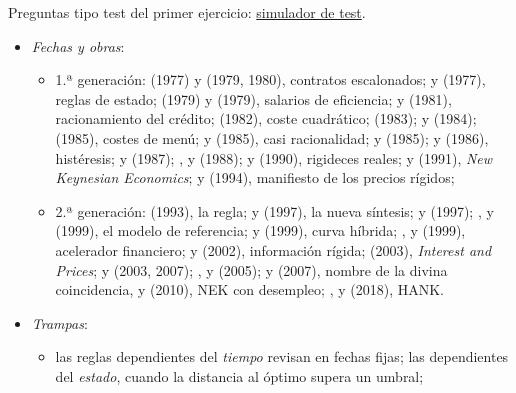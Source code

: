 \documentclass[11pt]{article}
\begin{document}
\begin{anotaciones}
Preguntas tipo test del primer ejercicio: \href{https://www.victorgutierrezmarcos.es/oposicion/temario/primer-ejercicio/test/simulador.html?tema=3.A.7}{simulador de test}.
\end{anotaciones}

\begin{itemize}
\item \emph{Fechas y obras}:
  \begin{itemize}
  \item 1.ª generación:  (1977) y  (1979, 1980), contratos escalonados;  y  (1977), reglas de estado;  (1979) y  (1979), salarios de eficiencia;  y  (1981), racionamiento del crédito;  (1982), coste cuadrático;  (1983);  y  (1984);  (1985), costes de menú;  y  (1985), casi racionalidad;  y  (1985);  y  (1986), histéresis;  y  (1987); ,  y  (1988);  y  (1990), rigideces reales;  y  (1991), \emph{New Keynesian Economics};  y  (1994), manifiesto de los precios rígidos;
  \item 2.ª generación:  (1993), la regla;  y  (1997), la nueva síntesis;  y  (1997); ,  y  (1999), el modelo de referencia;  y  (1999), curva híbrida; ,  y  (1999), acelerador financiero;  y  (2002), información rígida;  (2003), \emph{Interest and Prices};  y  (2003, 2007); ,  y  (2005);  y  (2007), nombre de la divina coincidencia, y (2010), NEK con desempleo; ,  y  (2018), HANK.
  \end{itemize}
\item \emph{Trampas}:
  \begin{itemize}
  \item las reglas dependientes del \emph{tiempo} revisan en fechas fijas; las dependientes del \emph{estado}, cuando la distancia al óptimo supera un umbral;

\end{itemize}
\end{itemize}
\end{document}
